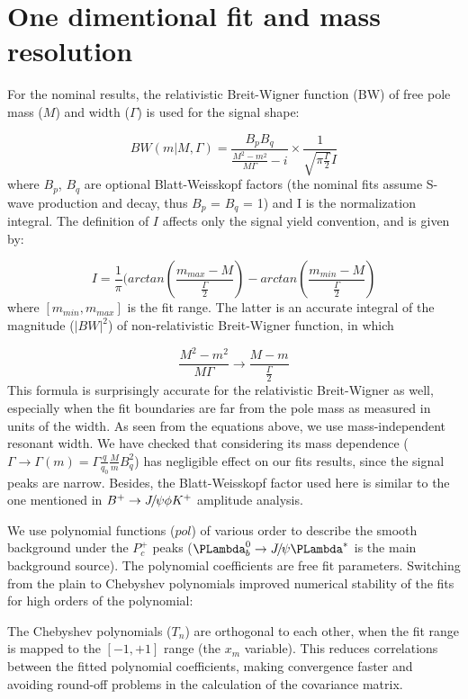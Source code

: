 \section{One dimentional fit and mass resolution}

For the nominal results, 
the relativistic Breit-Wigner function (BW) of free pole mass ($M$) and width ($\Gamma$) is used for the signal shape:

\begin{equation}
	BW(m|M,\Gamma) = \frac{B_{p}B_{q}} { \frac{M^{2}-m^{2}}{M\Gamma} - i} 
	\times \frac{1}{\sqrt{\pi \frac{\Gamma}{2}} I}  
\end{equation}
where $B_{p}$, $B_{q}$ are optional Blatt-Weisskopf factors
(the nominal fits assume S-wave production and decay, thus $B_{p}$ = $B_{q}$ = 1) 
and I is the normalization integral. 
The definition of $I$ affects only the signal yield convention, and is given by:

\begin{equation}
	I = \frac{1}{\pi} ( arctan( \frac{m_{max}-M} { \frac{\Gamma}{2} } ) 
		- arctan( \frac{m_{min}-M} { \frac{\Gamma}{2} } )
\end{equation}
where $[m_{min},m_{max}]$ is the fit range. 
The latter is an accurate integral of the magnitude ($|BW|^2$) of non-relativistic Breit-Wigner function, in which

\begin{equation}
	\frac{M^{2}-m^{2}}{M\Gamma} \to \frac{M-m}{\frac{\Gamma}{2}}
\end{equation}
This formula is surprisingly accurate for the relativistic Breit-Wigner as well,
especially when the fit boundaries are far from the pole mass as measured in units of the width. 
As seen from the equations above, we use mass-independent resonant width. 
We have checked that considering its mass dependence ($\Gamma\to\Gamma(m)=\Gamma\frac{q}{q_{0}}\frac{M}{m}B_{q}^{2}$) 
has negligible effect on our fits results, since the signal peaks are narrow.
Besides,
the Blatt-Weisskopf  factor used here is similar to the one mentioned in ${{{B}^+}}\rightarrow{\ensuremath{{J\mskip -3mu/\mskip -2mu\psi}}}\phi{\ensuremath{{K}^+}}$ amplitude analysis.


We use polynomial functions ($pol$) of various order to describe the smooth background 
under the $P_{c}^+$ peaks ($\Lb\to\jpsi\Lz^{*}$ is the main background source). 
The polynomial coefficients are free fit parameters. 
Switching from the plain to Chebyshev polynomials improved numerical stability of the fits for high orders of the polynomial:

The Chebyshev polynomials ($T_{n}$) are orthogonal to each other, 
when the fit range is mapped to the $[−1, +1]$ range (the $x_m$ variable). 
This reduces correlations between the fitted polynomial coefficients, 
making convergence faster and avoiding round-off problems in the calculation of the covariance matrix.

